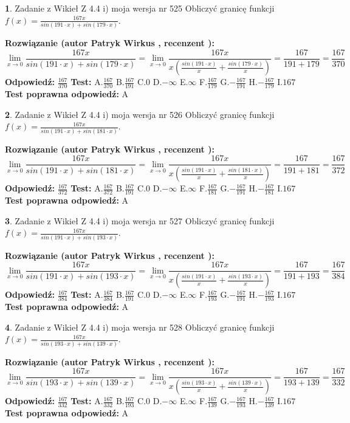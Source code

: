 \documentclass[12pt, a4paper]{article}
\theoremstyle{definition} %
\newtheorem{zad}{}
\newcommand{\zadStart}[1]{\begin{zad}#1\newline}
\newcommand{\zadStop}{\end{zad}}
\newcommand{\rozwStart}[2]{\noindent \textbf{Rozwiązanie (autor #1 , recenzent #2): }\newline}
\newcommand{\rozwStop}{\newline}
\newcommand{\odpStart}{\noindent \textbf{Odpowiedź:}\newline}
\newcommand{\odpStop}{\newline}
\newcommand{\testStart}{\noindent \textbf{Test:}\newline}
\newcommand{\testStop}{\newline}
\newcommand{\kluczStart}{\noindent \textbf{Test poprawna odpowiedź:}\newline}
\newcommand{\kluczStop}{\newline}
\begin{document}
\zadStart{Zadanie z Wikieł Z 4.4 i) moja wersja nr 525}
Obliczyć granicę funkcji $f(x)=\frac{167x}{sin(191\cdot x) +sin(179\cdot x)}$.
\zadStop
\rozwStart{Patryk Wirkus}{}
$$\lim\limits_{x\to 0}\frac{167x}{sin(191\cdot x) +sin(179\cdot x)}=\lim\limits_{x\to 0}\frac{167x}{x(\frac{sin(191\cdot x)}{x}+\frac{sin(179\cdot x)}{x})}=\frac{167}{191+179} = \frac{167}{370}$$
\rozwStop
\odpStart
$\frac{167}{370}$
\odpStop
\testStart
A.$\frac{167}{370}$
B.$\frac{167}{191}$
C.$0$
D.$-\infty$
E.$\infty$
F.$\frac{167}{179}$
G.$-\frac{167}{191}$
H.$-\frac{167}{179}$
I.$167$
\testStop
\kluczStart
A
\kluczStop



\zadStart{Zadanie z Wikieł Z 4.4 i) moja wersja nr 526}
Obliczyć granicę funkcji $f(x)=\frac{167x}{sin(191\cdot x) +sin(181\cdot x)}$.
\zadStop
\rozwStart{Patryk Wirkus}{}
$$\lim\limits_{x\to 0}\frac{167x}{sin(191\cdot x) +sin(181\cdot x)}=\lim\limits_{x\to 0}\frac{167x}{x(\frac{sin(191\cdot x)}{x}+\frac{sin(181\cdot x)}{x})}=\frac{167}{191+181} = \frac{167}{372}$$
\rozwStop
\odpStart
$\frac{167}{372}$
\odpStop
\testStart
A.$\frac{167}{372}$
B.$\frac{167}{191}$
C.$0$
D.$-\infty$
E.$\infty$
F.$\frac{167}{181}$
G.$-\frac{167}{191}$
H.$-\frac{167}{181}$
I.$167$
\testStop
\kluczStart
A
\kluczStop



\zadStart{Zadanie z Wikieł Z 4.4 i) moja wersja nr 527}
Obliczyć granicę funkcji $f(x)=\frac{167x}{sin(191\cdot x) +sin(193\cdot x)}$.
\zadStop
\rozwStart{Patryk Wirkus}{}
$$\lim\limits_{x\to 0}\frac{167x}{sin(191\cdot x) +sin(193\cdot x)}=\lim\limits_{x\to 0}\frac{167x}{x(\frac{sin(191\cdot x)}{x}+\frac{sin(193\cdot x)}{x})}=\frac{167}{191+193} = \frac{167}{384}$$
\rozwStop
\odpStart
$\frac{167}{384}$
\odpStop
\testStart
A.$\frac{167}{384}$
B.$\frac{167}{191}$
C.$0$
D.$-\infty$
E.$\infty$
F.$\frac{167}{193}$
G.$-\frac{167}{191}$
H.$-\frac{167}{193}$
I.$167$
\testStop
\kluczStart
A
\kluczStop



\zadStart{Zadanie z Wikieł Z 4.4 i) moja wersja nr 528}
Obliczyć granicę funkcji $f(x)=\frac{167x}{sin(193\cdot x) +sin(139\cdot x)}$.
\zadStop
\rozwStart{Patryk Wirkus}{}
$$\lim\limits_{x\to 0}\frac{167x}{sin(193\cdot x) +sin(139\cdot x)}=\lim\limits_{x\to 0}\frac{167x}{x(\frac{sin(193\cdot x)}{x}+\frac{sin(139\cdot x)}{x})}=\frac{167}{193+139} = \frac{167}{332}$$
\rozwStop
\odpStart
$\frac{167}{332}$
\odpStop
\testStart
A.$\frac{167}{332}$
B.$\frac{167}{193}$
C.$0$
D.$-\infty$
E.$\infty$
F.$\frac{167}{139}$
G.$-\frac{167}{193}$
H.$-\frac{167}{139}$
I.$167$
\testStop
\kluczStart
A
\kluczStop
\end{document}
